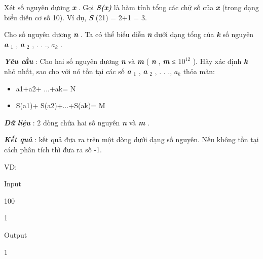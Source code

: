 



   Xét số nguyên dương   \textbf{\emph{     x    }}   . Gọi   \textbf{\emph{     S(x)    }}   là hàm tính tổng các chữ số của   \textbf{\emph{     x    }}   (trong dạng biểu diễn cơ số 10). Ví dụ,   \textbf{\emph{     S    }}   (21) = 2+1 = 3.  

   Cho số nguyên dương   \textbf{\emph{     n    }}   . Ta có thể biểu diễn   \textbf{\emph{     n    }}   dưới dạng tổng của   \textbf{\emph{     k    }}   số nguyên   \textbf{\emph{     a    }}$_    1   $   ,   \textbf{\emph{     a    }}$_    2   $   , . . .,   \textbf{\emph{     $a_{k}$}}   .  

\textbf{\emph{     Yêu cầu    }}   : Cho hai số nguyên dương   \textbf{\emph{     n    }}   và   \textbf{\emph{     m    }}   (   \textbf{\emph{     n    }}   ,   \textbf{\emph{     m    }}   ≤ $10^{12}$   ). Hãy xác định   \textbf{\emph{     k    }}   nhỏ nhất, sao cho với nó tồn tại các số   \textbf{\emph{     a    }}$_    1   $   ,   \textbf{\emph{     a    }}$_    2   $   , . . .,   \textbf{\emph{     $a_{k}$}}   thỏa mãn:  
\begin{itemize}
	\item     a1+a2+ ...+ak= N   
	\item     S(a1)+ S(a2)+...+S(ak)= M   
\end{itemize}

\textbf{\emph{     Dữ liệu    }}   : 2 dòng chứa hai số nguyên   \textbf{\emph{     n    }}   và   \textbf{\emph{     m    }}   .  

\textbf{\emph{     Kết quả    }}   : kết quả đưa ra trên một dòng dưới dạng số nguyên. Nếu không tồn tại cách phân tích thì đưa ra số -1.  

   VD:  

   Input  

   100  

   1  

   Output  

   1  
